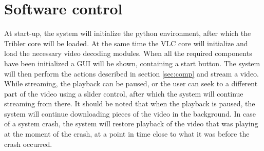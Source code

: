 \section{Software control}
\label{sec:softctrl}
At start-up, the system will initialize the python environment, after which the Tribler core will be loaded. At the same time the VLC core will initialize and load the necessary video decoding modules. When all the required components have been initialized a GUI will be shown, containing a start button. The system will then perform the actions described in section \ref{sec:comp} and stream a video. While streaming, the playback can be paused, or the user can seek to a different part of the video using a slider control, after which the system will continue streaming from there. It should be noted that when the playback is paused, the system will continue downloading pieces of the video in the background. In case of a system crash, the system will restore playback of the video that was playing at the moment of the crash, at a point in time close to what it was before the crash occurred.